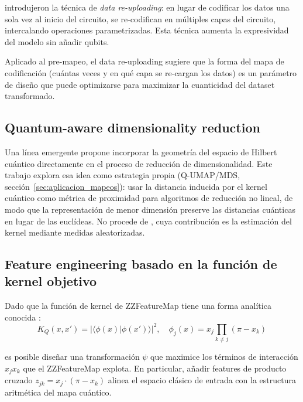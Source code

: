 \citet{perezSalinas2020} introdujeron la técnica de \textit{data re-uploading}: en lugar de codificar los datos una sola vez al inicio del circuito, se re-codifican en múltiples capas del circuito, intercalando operaciones parametrizadas. Esta técnica aumenta la expresividad del modelo sin añadir qubits.

Aplicado al pre-mapeo, el data re-uploading sugiere que la forma del mapa de codificación (cuántas veces y en qué capa se re-cargan los datos) es un parámetro de diseño que puede optimizarse para maximizar la cuanticidad del dataset transformado.

\subsection{Quantum-aware dimensionality reduction}

Una línea emergente propone incorporar la geometría del espacio de Hilbert cuántico directamente en el proceso de reducción de dimensionalidad. Este trabajo explora esa idea como estrategia propia (Q-UMAP/MDS, sección~\ref{sec:aplicacion_mapeos}): usar la distancia inducida por el kernel cuántico como métrica de proximidad para algoritmos de reducción no lineal, de modo que la representación de menor dimensión preserve las distancias cuánticas en lugar de las euclídeas. No procede de \citet{haug2023}, cuya contribución es la estimación del kernel mediante medidas aleatorizadas.

\subsection{Feature engineering basado en la función de kernel objetivo}

Dado que la función de kernel de ZZFeatureMap tiene una forma analítica conocida \citep{havlicek2019}:
\begin{equation}
    K_Q(x, x') = \left|\langle \phi(x) | \phi(x') \rangle\right|^2, \quad \phi_j(x) = x_j \prod_{k \neq j} (\pi - x_k)
    \label{eq:zzfeaturemap_kernel}
\end{equation}

es posible diseñar una transformación $\psi$ que maximice los términos de interacción $x_j x_k$ que el ZZFeatureMap explota. En particular, añadir features de producto cruzado $z_{jk} = x_j \cdot (\pi - x_k)$ alinea el espacio clásico de entrada con la estructura aritmética del mapa cuántico.

